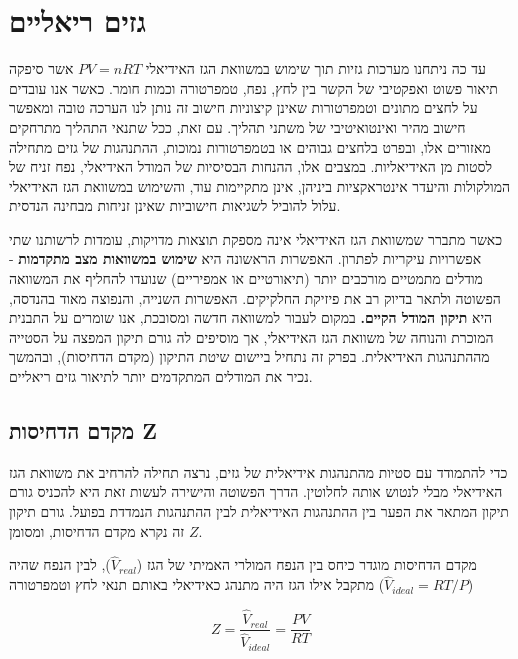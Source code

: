 \documentclass[
  hebrew,
  letterpaper,
  DIV=11,
  numbers=noendperiod]{scrreprt}
\begin{document}
\section{גזים
ריאליים}\label{ux5d2ux5d6ux5d9ux5dd-ux5e8ux5d9ux5d0ux5dcux5d9ux5d9ux5dd}

עד כה ניתחנו מערכות גזיות תוך שימוש במשוואת הגז האידיאלי \(PV = nRT\)
אשר סיפקה תיאור פשוט ואפקטיבי של הקשר בין לחץ, נפח, טמפרטורה וכמות חומר.
כאשר אנו עובדים על לחצים מתונים וטמפרטורות שאינן קיצוניות חישוב זה נותן
לנו הערכה טובה ומאפשר חישוב מהיר ואינטואיטיבי של משתני תהליך. עם זאת,
ככל שתנאי התהליך מתרחקים מאזורים אלו, ובפרט בלחצים גבוהים או בטמפרטורות
נמוכות, ההתנהגות של גזים מתחילה לסטות מן האידיאליות. במצבים אלו, ההנחות
הבסיסיות של המודל האידיאלי, נפח זניח של המולקולות והיעדר אינטראקציות
ביניהן, אינן מתקיימות עוד, והשימוש במשוואת הגז האידיאלי עלול להוביל
לשגיאות חישוביות שאינן זניחות מבחינה הנדסית.

כאשר מתברר שמשוואת הגז האידיאלי אינה מספקת תוצאות מדויקות, עומדות
לרשותנו שתי אפשרויות עיקריות לפתרון. האפשרות הראשונה היא \textbf{שימוש
במשוואות מצב מתקדמות} - מודלים מתמטיים מורכבים יותר (תיאורטיים או
אמפיריים) שנועדו להחליף את המשוואה הפשוטה ולתאר בדיוק רב את פיזיקת
החלקיקים. האפשרות השנייה, והנפוצה מאוד בהנדסה, היא \textbf{תיקון המודל
הקיים.} במקום לעבור למשוואה חדשה ומסובכת, אנו שומרים על התבנית המוכרת
והנוחה של משוואת הגז האידיאלי, אך מוסיפים לה \textquotesingle גורם
תיקון\textquotesingle{} המפצה על הסטייה מההתנהגות האידיאלית. בפרק זה
נתחיל ביישום שיטת התיקון (מקדם הדחיסות), ובהמשך נכיר את המודלים המתקדמים
יותר לתיאור גזים ריאליים.

\subsection{מקדם הדחיסות
Z}\label{ux5deux5e7ux5d3ux5dd-ux5d4ux5d3ux5d7ux5d9ux5e1ux5d5ux5ea-z}

כדי להתמודד עם סטיות מהתנהגות אידיאלית של גזים, נרצה תחילה להרחיב את
משוואת הגז האידיאלי מבלי לנטוש אותה לחלוטין. הדרך הפשוטה והישירה לעשות
זאת היא להכניס גורם תיקון המתאר את הפער בין ההתנהגות האידיאלית לבין
ההתנהגות הנמדדת בפועל. גורם תיקון זה נקרא מקדם הדחיסות, ומסומן \(Z\).

מקדם הדחיסות מוגדר כיחס בין הנפח המולרי האמיתי של הגז
(\({\widehat{V}}_{real}\)), לבין הנפח שהיה מתקבל אילו הגז היה מתנהג
כאידיאלי באותם תנאי לחץ וטמפרטורה
(\({\widehat{V}}_{ideal} = RT\text{/}P\))

\[Z = \frac{{\widehat{V}}_{real}}{{\widehat{V}}_{ideal}} = \frac{P\widehat{V}}{RT}\]
\end{document}
